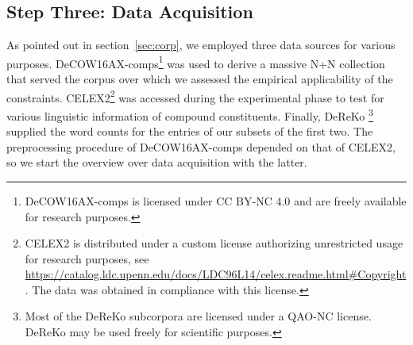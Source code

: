 \documentclass[10pt, a4paper]{article}
\begin{document}


\subsection{Step Three: Data Acquisition}
\label{sec:data}

As pointed out in section~\ref{sec:corp}, we employed three data sources for various purposes. DeCOW16AX-comps\footnote{DeCOW16AX-comps is licensed under CC BY-NC 4.0 and are freely available for research purposes.} was used to derive a massive N+N collection that served the corpus over which we assessed the empirical applicability of the constraints. CELEX2\footnote{CELEX2 is distributed under a custom license authorizing unrestricted usage for research purposes, see \url{https://catalog.ldc.upenn.edu/docs/LDC96L14/celex.readme.html\#Copyright}. The data was obtained in compliance with this license.} was accessed during the experimental phase to test for various linguistic information of compound constituents. Finally, DeReKo \footnote{Most of the DeReKo subcorpora are licensed under a QAO-NC license. DeReKo may be used freely for scientific purposes.} supplied the word counts for the entries of our subsets of the first two. The preprocessing procedure of DeCOW16AX-comps depended on that of CELEX2, so we start the overview over data acquisition with the latter.
\end{document}
